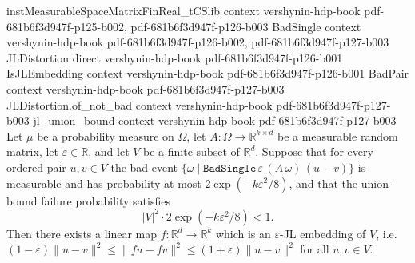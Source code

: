 \begin{theorem}
\label{exists_isJLEmbedding_of_pair_bound}
\leanok
{}

\proofstep
  {instMeasurableSpaceMatrixFinReal_tCSlib}
  {context}
  {vershynin-hdp-book}
  {pdf-681b6f3d947f-p125-b002,
    pdf-681b6f3d947f-p126-b003}
\proofstep
  {BadSingle}
  {context}
  {vershynin-hdp-book}
  {pdf-681b6f3d947f-p126-b002,
    pdf-681b6f3d947f-p127-b003}
\proofstep
  {JLDistortion}
  {direct}
  {vershynin-hdp-book}
  {pdf-681b6f3d947f-p126-b001}
\proofstep
  {IsJLEmbedding}
  {context}
  {vershynin-hdp-book}
  {pdf-681b6f3d947f-p126-b001}
\proofstep
  {BadPair}
  {context}
  {vershynin-hdp-book}
  {pdf-681b6f3d947f-p127-b003}
\proofstep
  {JLDistortion.of_not_bad}
  {context}
  {vershynin-hdp-book}
  {pdf-681b6f3d947f-p127-b003}
\proofstep
  {jl_union_bound}
  {context}
  {vershynin-hdp-book}
  {pdf-681b6f3d947f-p127-b003}
Let $\mu$ be a probability measure on $\Omega$, let
$A : \Omega \to \mathbb{R}^{k\times d}$ be a measurable random matrix, let
$\varepsilon\in\mathbb{R}$, and let $V$ be a finite subset of $\mathbb{R}^d$.
Suppose that for every ordered pair $u, v \in V$ the bad event
$\{\omega \mid \texttt{BadSingle}\,\varepsilon\,(A\,\omega)\,(u-v)\}$ is
measurable and has probability at most $2\exp(-k\varepsilon^2/8)$, and that
the union-bound failure probability satisfies
\[
  |V|^2 \cdot 2\exp(-k\varepsilon^2/8) < 1 .
\]
Then there exists a linear map $f : \mathbb{R}^d \to \mathbb{R}^k$ which is an
$\varepsilon$-JL embedding of $V$, i.e.\ $(1-\varepsilon)\|u-v\|^2 \le
\|f u - f v\|^2 \le (1+\varepsilon)\|u-v\|^2$ for all $u, v \in V$.
\end{theorem}
